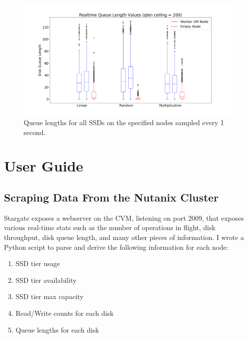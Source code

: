 \documentclass[12pt]{article}
\begin{document}
  \begin{figure}[!htb]
    \centering
    \includegraphics[scale=0.32]{images/qlen_200_box.png} 
    \caption{Queue lengths for all SSDs on the specified nodes sampled every 1
             second.}
    \label{fig:qlen_200}
  \end{figure}

\newpage
\FloatBarrier
\section{User Guide}

  \subsection{Scraping Data From the Nutanix Cluster}

  Stargate exposes a webserver on the CVM, listening on port 2009, that exposes
  various real-time stats such as the number of operations in flight, disk
  throughput, disk queue length, and many other pieces of information. I wrote
  a Python script to parse and derive the following information for each node:

  \begin{tcolorbox}
  \begin{enumerate}
    \item SSD tier usage
    \item SSD tier availability
    \item SSD tier max capacity
    \item Read/Write counts for each disk
    \item Queue lengths for each disk
  \end{enumerate}
  \end{tcolorbox}
\end{document}
